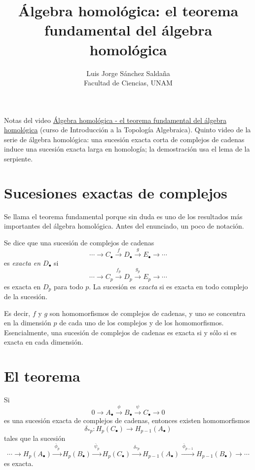 \documentclass[11pt]{article}
\title{Álgebra homológica: el teorema fundamental del álgebra homológica}
\author{Luis Jorge Sánchez Saldaña\\[2pt]\small Facultad de Ciencias, UNAM}
\date{}
\begin{document}
\maketitle

\noindent\small Notas del video
\href{https://www.youtube.com/watch?v=Mas14lot35A}{\guillemotleft{}Álgebra homológica - el teorema fundamental del álgebra homológica\guillemotright{}}
(curso de Introducción a la Topología Algebraica). Quinto video de la serie de álgebra homológica: una sucesión exacta corta de complejos de cadenas induce una sucesión exacta larga en homología; la demostración usa el lema de la serpiente.
\normalsize

\section*{Sucesiones exactas de complejos}

Se llama el teorema fundamental porque sin duda es uno de los resultados más importantes del álgebra homológica. Antes del enunciado, un poco de notación.

\begin{defn}\label{def:exacta-complejos}
Se dice que una sucesión de complejos de cadenas
\[
  \cdots\longrightarrow C_\bullet\xrightarrow{\ f\ }D_\bullet\xrightarrow{\ g\ }E_\bullet\longrightarrow\cdots
\]
es \emph{exacta en $D_\bullet$} si
\[
  \cdots\longrightarrow C_p\xrightarrow{\ f_p\ }D_p\xrightarrow{\ g_p\ }E_p\longrightarrow\cdots
\]
es exacta en $D_p$ para todo $p$. La sucesión es \emph{exacta} si es exacta en todo complejo de la sucesión.
\end{defn}

Es decir, $f$ y $g$ son homomorfismos de complejos de cadenas, y uno se concentra en la dimensión $p$ de cada uno de los complejos y de los homomorfismos. Esencialmente, una sucesión de complejos de cadenas es exacta si y sólo si es exacta en cada dimensión.

\section*{El teorema}

\begin{teo}\label{teo:fundamental}
Si
\[
  0\longrightarrow A_\bullet\xrightarrow{\ \phi\ }B_\bullet\xrightarrow{\ \psi\ }C_\bullet\longrightarrow0
\]
es una sucesión exacta de complejos de cadenas, entonces existen homomorfismos
\[
  \delta_{*p}\colon H_p(C_\bullet)\longrightarrow H_{p-1}(A_\bullet)
\]
tales que la sucesión
\[
  \cdots\longrightarrow H_p(A_\bullet)\xrightarrow{\ \bar\phi_p\ }H_p(B_\bullet)\xrightarrow{\ \bar\psi_p\ }H_p(C_\bullet)\xrightarrow{\ \delta_{*p}\ }H_{p-1}(A_\bullet)\xrightarrow{\ \bar\phi_{p-1}\ }H_{p-1}(B_\bullet)\longrightarrow\cdots
\]
es exacta.
\end{teo}
\end{document}

